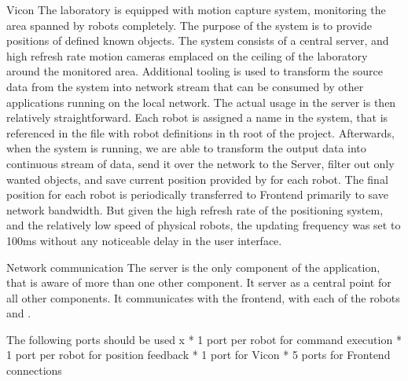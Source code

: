 \secc Vicon
The laboratory is equipped with {\vicon} motion capture system, monitoring the area spanned by robots completely. The purpose of the system is to provide positions of defined known objects.\br
The system consists of a central server, and high refresh rate motion cameras emplaced on the ceiling of the laboratory around the monitored area. Additional tooling is used to transform the source data from the {\vicon} system into network stream that can be consumed by other applications running on the local network.\br
The actual usage in the server is then relatively straightforward. Each robot is assigned a name in the {\vicon} system, that is referenced in the file with robot definitions in th root of the project. Afterwards, when the {\vicon} system is running, we are able to transform the output data into continuous stream of data, send it over the network to the Server, filter out only wanted objects, and save current position provided by {\vicon} for each robot. The final position for each robot is periodically transferred to Frontend primarily to save network bandwidth. But given the high refresh rate of the positioning system, and the relatively low speed of physical robots, the updating frequency was set to 100ms without any noticeable delay in the user interface.

\secc Network communication
The server is the only component of the application, that is aware of more than one other component. It server as a central point for all other components. It communicates with the frontend, with each of the robots and {\vicon}.

The following ports should be used 
\begitems \style x
    * 1 port per robot for command execution
    * 1 port per robot for position feedback
    * 1 port for Vicon
    * 5 ports for Frontend connections
\enditems

